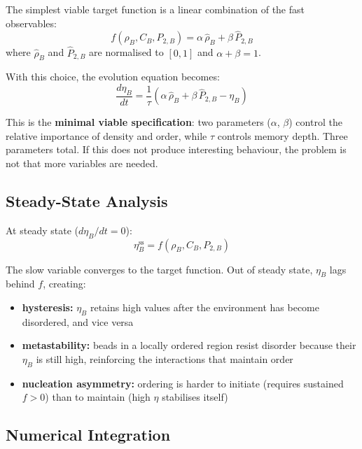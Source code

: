 \documentclass[11pt]{article}
\begin{document}
The simplest viable target function is a linear combination of the fast
observables:
\begin{equation}
    f(\rho_B, C_B, P_{2,B})
    = \alpha\, \hat{\rho}_B + \beta\, \hat{P}_{2,B}
\end{equation}
where $\hat{\rho}_B$ and $\hat{P}_{2,B}$ are normalised to $[0, 1]$ and
$\alpha + \beta = 1$.

With this choice, the evolution equation becomes:
\begin{equation}
    \frac{d\eta_B}{dt}
    = \frac{1}{\tau}\left(
        \alpha\, \hat{\rho}_B + \beta\, \hat{P}_{2,B} - \eta_B
    \right)
\end{equation}

This is the \textbf{minimal viable specification}: two parameters ($\alpha$,
$\beta$) control the relative importance of density and order, while $\tau$
controls memory depth.  Three parameters total.  If this does not produce
interesting behaviour, the problem is not that more variables are needed.

\subsection{Steady-State Analysis}

At steady state ($d\eta_B/dt = 0$):
\begin{equation}
    \eta_B^{\mathrm{ss}} = f(\rho_B, C_B, P_{2,B})
\end{equation}

The slow variable converges to the target function.  Out of steady state,
$\eta_B$ lags behind $f$, creating:
\begin{itemize}
    \item \textbf{hysteresis:} $\eta_B$ retains high values after the
          environment has become disordered, and vice versa
    \item \textbf{metastability:} beads in a locally ordered region resist
          disorder because their $\eta_B$ is still high, reinforcing the
          interactions that maintain order
    \item \textbf{nucleation asymmetry:} ordering is harder to initiate
          (requires sustained $f > 0$) than to maintain (high $\eta$
          stabilises itself)
\end{itemize}

\subsection{Numerical Integration}
\end{document}
